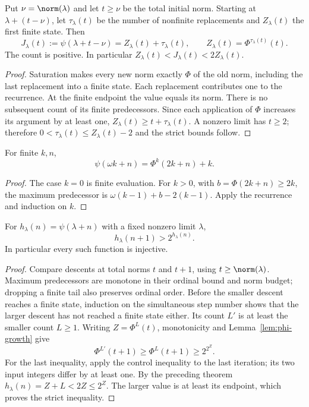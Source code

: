 \begin{theorem}\label{thm:complete-count}
Put $\nu=\norm(\lambda)$ and let $t\ge\nu$ be the total initial norm.
Starting at $\lambda+(t-\nu)$, let $\tau_\lambda(t)$ be the number of
nonfinite replacements and $Z_\lambda(t)$ the first finite state.  Then
\[
 J_\lambda(t):=\psi(\lambda+t-\nu)
       =Z_\lambda(t)+\tau_\lambda(t),\qquad
 Z_\lambda(t)=\Phi^{\tau_\lambda(t)}(t).
\]
The count is positive.  In particular $Z_\lambda(t)<J_\lambda(t)<2Z_\lambda(t)$.
\end{theorem}
\begin{proof}
Saturation makes every new norm exactly $\Phi$ of the old norm, including
the last replacement into a finite state.  Each replacement contributes
one to the recurrence.  At the finite endpoint the value equals its norm.
There is no subsequent count of its finite predecessors.
Since each application of $\Phi$ increases its argument by at least one,
$Z_\lambda(t)\ge t+\tau_\lambda(t)$.  A nonzero limit has $t\ge2$;
therefore $0<\tau_\lambda(t)\le Z_\lambda(t)-2$ and the strict bounds follow.
\end{proof}

\begin{corollary}\label{cor:finite-head}
For finite $k,n$,
\[
 \psi(\omega k+n)=\Phi^k(2k+n)+k.
\]
\end{corollary}
\begin{proof}
The case $k=0$ is finite evaluation.  For $k>0$, with
$b=\Phi(2k+n)\ge2k$, the maximum predecessor is
$\omega(k-1)+b-2(k-1)$.  Apply the recurrence and induction on $k$.
\end{proof}

\begin{lemma}\label{lem:tail-separation}
For $h_\lambda(n)=\psi(\lambda+n)$ with a fixed nonzero limit $\lambda$,
\[
 h_\lambda(n+1)>2^{h_\lambda(n)}.
\]
In particular every such function is injective.
\end{lemma}
\begin{proof}
Compare descents at total norms $t$ and $t+1$, using $t\ge\norm(\lambda)$.
Maximum predecessors are monotone in their ordinal bound and norm budget;
dropping a finite tail also preserves ordinal order.  Before the smaller
descent reaches a finite state, induction on the simultaneous step number
shows that the larger descent has not reached a finite state either.  Its
count $L'$ is at least the smaller count $L\ge1$.
Writing $Z=\Phi^L(t)$, monotonicity and Lemma~\ref{lem:phi-growth} give
\[
 \Phi^{L'}(t+1)\ge\Phi^L(t+1)\ge 2^{2^Z}.
\]
For the last inequality, apply the control inequality to the last iteration;
its two input integers differ by at least one.  By the preceding theorem
$h_\lambda(n)=Z+L<2Z\le2^Z$.  The larger value is at least its endpoint,
which proves the strict inequality.
\end{proof}

